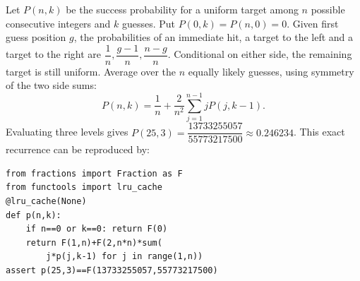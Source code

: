 Let $P(n,k)$ be the success probability for a uniform target among $n$ possible consecutive integers and $k$ guesses. Put $P(0,k)=P(n,0)=0$. Given first guess position $g$, the probabilities of an immediate hit, a target to the left and a target to the right are $\dfrac{1}{n},\dfrac{g-1}{n},\dfrac{n-g}{n}$. Conditional on either side, the remaining target is still uniform. Average over the $n$ equally likely guesses, using symmetry of the two side sums:
\[P(n,k)=\dfrac{1}{n}+\dfrac{2}{n^2}\sum_{j=1}^{n-1}jP(j,k-1).\]
Evaluating three levels gives $\boxed{P(25,3)=\dfrac{13733255057}{55773217500}\approx0.246234}$. This exact recurrence can be reproduced by:
\begin{verbatim}
from fractions import Fraction as F
from functools import lru_cache
@lru_cache(None)
def p(n,k):
    if n==0 or k==0: return F(0)
    return F(1,n)+F(2,n*n)*sum(
        j*p(j,k-1) for j in range(1,n))
assert p(25,3)==F(13733255057,55773217500)
\end{verbatim}
